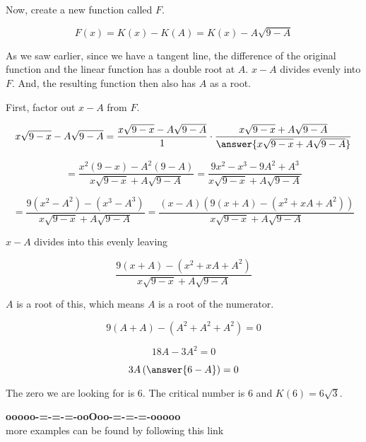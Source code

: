 \documentclass{ximera}
\begin{document}
\begin{procedure}
Now, create a new function called $F$.

\[
F(x) = K(x) - K(A) = K(x) - A\sqrt{9-A}
\]


As we saw earlier, since we have a tangent line, the difference of the original function and the linear function has a double root at $A$.  $x-A$ divides evenly into $F$.  And, the resulting function then also has $A$ as a root.  

First, factor out $x-A$ from $F$.


\[
x\sqrt{9-x} - A\sqrt{9-A} = \frac{x\sqrt{9-x} - A\sqrt{9-A}}{1} \cdot \frac{x\sqrt{9-x} + A\sqrt{9-A}}{\answer{x\sqrt{9-x} + A\sqrt{9-A}}}
\]

\[
= \frac{x^2 (9-x) - A^2 (9-A)}{x\sqrt{9-x} + A\sqrt{9-A}} = \frac{9x^2 - x^3 - 9A^2 + A^3}{x\sqrt{9-x} + A\sqrt{9-A}}
\]


\[
= \frac{9(x^2-A^2) - (x^3 - A^3)}{x\sqrt{9-x} + A\sqrt{9-A}} = \frac{(x-A)(9(x+A)-(x^2 + xA + A^2))}{x\sqrt{9-x} + A\sqrt{9-A}}
\]


$x-A$ divides into this evenly leaving

\[
\frac{9(x+A)-(x^2 + xA + A^2)}{x\sqrt{9-x} + A\sqrt{9-A}}
\]

$A$ is a root of this, which means $A$ is a root of the numerator.


\[
9(A+A)-(A^2 + A^2 + A^2) = 0
\]

\[
18A - 3A^2 = 0
\]

\[
3A \left(\answer{6-A} \right) = 0
\]


The zero we are looking for is $6$.
The critical number is $6$ and $K(6) = 6 \sqrt{3}$.


\end{procedure}




















\begin{center}
\textbf{\textcolor{green!50!black}{ooooo-=-=-=-ooOoo-=-=-=-ooooo}} \\

more examples can be found by following this link\\ 

\end{center}
\end{document}
